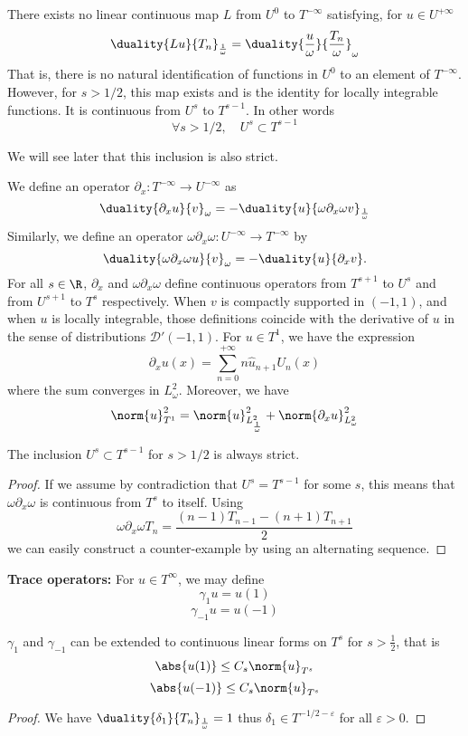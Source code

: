 \documentclass[]{article}
\begin{document}
\begin{Prop}
	There exists no linear continuous map $L$ from $U^0$ to $T^{-\infty}$ satisfying, for $u \in U^{+\infty}$
	\[\duality{Lu}{T_n}_\frac{1}{\omega} = \duality{\frac{u}{\omega}}{\frac{T_n}{\omega}}_\omega\]
	That is, there is no natural identification of functions in $U^0$ to an element of $T^{-\infty}$. However, for $s > 1/2$, this map exists and is the identity for locally integrable functions. It is continuous from $U^s$ to $T^{s-1}$. In other words
	\[\forall s > 1/2, \quad U^s \subset T^{s-1}\]
\end{Prop}
We will see later that this inclusion is also strict. 
\begin{Def}
	We define an operator $\partial_x : T^{-\infty} \to U^{-\infty}$ as 
	\[\duality{\partial_x u}{v}_\omega = - \duality{u}{\omega \partial_x \omega v}_\frac{1}{\omega}\]
	Similarly, we define an operator $\omega\partial_x\omega : U^{-\infty} \to T^{-\infty}$ by
	\[\duality{\omega\partial_x\omega u}{v}_\omega = -\duality{u}{\partial_x v}.\]
	For all $s \in \R$, $\partial_x$ and $\omega \partial_x \omega$ define continuous operators from $T^{s+1}$ to $U^s$ and from $U^{s+1}$ to $T^s$ respectively. When $v$ is compactly supported in $(-1,1)$, and when $u$ is locally integrable, those definitions coincide with the derivative of $u$ in the sense of distributions $\mathcal{D}'(-1,1)$. For $u \in T^1$, we have the expression
	\[\partial_x u(x) = \sum_{n=0}^{+ \infty} n \hat{u}_{n+1}U_n(x)\]
	where the sum converges in $L^2_\omega$. Moreover, we have
	\[\norm{u}_{T^1}^2 = \norm{u}_{L^2_\frac{1}{\omega}}^2 + \norm{\partial_x u}^2_{L^2_\omega}\]
\end{Def}
\begin{Prop}
	The inclusion $U^s \subset T^{s-1}$ for $s > 1/2$ is always strict.
	\begin{proof}
		If we assume by contradiction that $U^s = T^{s-1}$ for some $s$, this means that $\omega \partial_x \omega$ is continuous from $T^s$ to itself. Using 
		\[\omega \partial_x \omega T_n  = \frac{(n-1)T_{n-1} - (n+1)T_{n+1}}{2}\]
		we can easily construct a counter-example by using an alternating sequence. 
	\end{proof}
\end{Prop}
\begin{Def}
	\textbf{Trace operators:} For $u \in T^{\infty}$, we may define 
	\[\gamma_1 u = u(1)\]
	\[\gamma_{-1} u = u(-1)\]
\end{Def}
\begin{Prop}
	$\gamma_1$ and $\gamma_{-1}$ can be extended to continuous linear forms on $T^{s}$ for $s > \frac{1}{2}$, that is 
	\[\abs{u(1)} \leq C_s \norm{u}_{T^{s}} \] 
	\[\abs{u(-1)} \leq C_s \norm{u}_{T^{s}} \] 
	\begin{proof}
		We have $\duality{\delta_1}{T_n}_\frac{1}{\omega} = 1$ thus $\delta_1 \in T^{-1/2-\varepsilon}$ for all $\varepsilon > 0$. 
	\end{proof}
\end{Prop}
\end{document}
